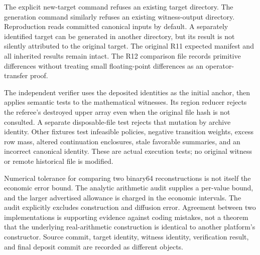 The explicit new-target command refuses an existing target directory. The generation command similarly refuses an existing witness-output directory. Reproduction reads committed canonical inputs by default. A separately identified target can be generated in another directory, but its result is not silently attributed to the original target. The original R11 expected manifest and all inherited results remain intact. The R12 comparison file records primitive differences without treating small floating-point differences as an operator-transfer proof.

The independent verifier uses the deposited identities as the initial anchor, then applies semantic tests to the mathematical witnesses. Its region reducer rejects the referee's destroyed upper array even when the original file hash is not consulted. A separate disposable-file test rejects that mutation by archive identity. Other fixtures test infeasible policies, negative transition weights, excess row mass, altered continuation enclosures, stale favorable summaries, and an incorrect canonical identity. These are actual execution tests; no original witness or remote historical file is modified.

Numerical tolerance for comparing two binary64 reconstructions is not itself the economic error bound. The analytic arithmetic audit supplies a per-value bound, and the larger advertised allowance is charged in the economic intervals. The audit explicitly excludes construction and diffusion error. Agreement between two implementations is supporting evidence against coding mistakes, not a theorem that the underlying real-arithmetic construction is identical to another platform's constructor. Source commit, target identity, witness identity, verification result, and final deposit commit are recorded as different objects.
